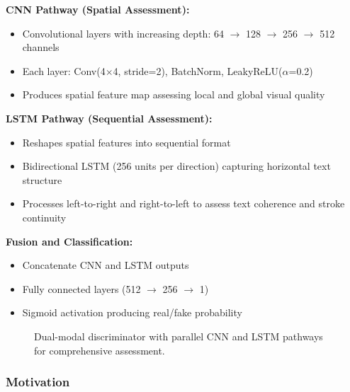 \documentclass[journal]{IEEEtran}
\begin{document}
\textbf{CNN Pathway (Spatial Assessment):}
\begin{itemize}
    \item Convolutional layers with increasing depth: 64 $\rightarrow$ 128 $\rightarrow$ 256 $\rightarrow$ 512 channels
    \item Each layer: Conv(4$\times$4, stride=2), BatchNorm, LeakyReLU($\alpha$=0.2)
    \item Produces spatial feature map assessing local and global visual quality
\end{itemize}

\textbf{LSTM Pathway (Sequential Assessment):}
\begin{itemize}
    \item Reshapes spatial features into sequential format
    \item Bidirectional LSTM (256 units per direction) capturing horizontal text structure
    \item Processes left-to-right and right-to-left to assess text coherence and stroke continuity
\end{itemize}

\textbf{Fusion and Classification:}
\begin{itemize}
    \item Concatenate CNN and LSTM outputs
    \item Fully connected layers (512 $\rightarrow$ 256 $\rightarrow$ 1)
    \item Sigmoid activation producing real/fake probability
\end{itemize}

\begin{figure}[!t]
\centering
\caption{Dual-modal discriminator with parallel CNN and LSTM pathways for comprehensive assessment.}
\label{fig:discriminator_arch}
\end{figure}

\subsubsection{Motivation}
\end{document}
